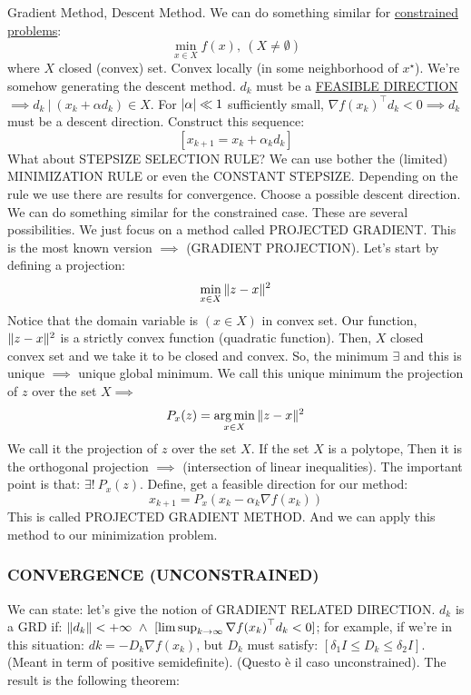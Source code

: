 Gradient Method, Descent Method. We can do something similar for \underline{constrained problems}:
\[
	\min_{x\in X}{f(x)},\ (X\neq\emptyset)
\]
where $X$ closed (convex) set. Convex locally (in some neighborhood of $x^\star$). We're somehow generating the descent method. $d_k$ must be a \underline{FEASIBLE DIRECTION} $\implies d_k\ |\ (x_k +\alpha d_k)\in X$. For $\lvert\alpha\rvert\ll 1$ sufficiently small, $\nabla{f(x_k)}^\top d_k <0 \implies d_k$ must be a descent direction. Construct this sequence:
\[
	[x_{k+1} = x_k + \alpha_kd_k]
\]
What about STEPSIZE SELECTION RULE? We can use bother the (limited) MINIMIZATION RULE or even the CONSTANT STEPSIZE. Depending on the rule we use there are results for convergence. Choose a possible descent direction. We can do something similar for the constrained case. These are several possibilities. We just focus on a method called PROJECTED GRADIENT. This is the most known version $\implies$ (GRADIENT PROJECTION). Let's start by defining a projection:
\[
	\min_{x\in X}{\lVert z-x\rVert^2}
\]
Notice that the domain variable is $(x\in X)$ in convex set. Our function, $\lVert z-x\rVert^2$ is a strictly convex function (quadratic function). Then, $X$ closed convex set and we take it to be closed and convex. So, the minimum $\exists$ and this is unique $\implies$ unique global minimum. We call this unique minimum the projection of $z$ over the set $X \implies$
\[
	P_x(z) = \operatorname*{arg\,min}_{x\in X}{\lVert z-x\rVert^2}
\]
We call it the projection of $z$ over the set $X$. If the set $X$ is a polytope, Then it is the orthogonal projection $\implies$ (intersection of linear inequalities). The important point is that: $\exists!\ P_x(z)$. Define, get a feasible direction for our method:
\[
	x_{k+1} = P_x(x_k-\alpha_k\nabla{f(x_k)})
\]
This is called PROJECTED GRADIENT METHOD. And we can apply this method to our minimization problem.

\subsubsection{CONVERGENCE (UNCONSTRAINED)}

We can state: let's give the notion of GRADIENT RELATED DIRECTION. $d_k$ is a GRD if: $\norma{d_k}<+\infty\ \land\ [\limsup_{k\to\infty}{\nabla{f(x_k)}^\top d_k} < 0]$; for example, if we're in this situation: $dk = -D_k\nabla{f(x_k)}$, but $D_k$ must satisfy: $[\delta_1I \leq D_k \leq \delta_2I]$. (Meant in term of positive semidefinite). (Questo è il caso unconstrained). The result is the following theorem:

